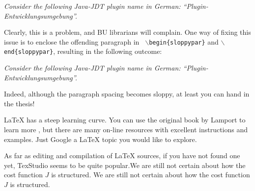 \bigskip

{\it Consider the following Java-JDT plugin name in German: "`Plugin-Entwicklungsumgebung"'.}

\bigskip

Clearly, this is a problem, and BU librarians will complain. One way of fixing
this issue is to enclose the offending paragraph in {\tt
	$\backslash$begin\{sloppypar\}} and {\tt $\backslash$end\{sloppypar\}},
resulting in the following outcome:

\bigskip

\begin{sloppypar}
	{\it Consider the following Java-JDT plugin name in German:
		"`Plugin-Entwicklungsumgebung"'.}
\end{sloppypar}

\bigskip

Indeed, although the paragraph spacing becomes sloppy, at least you can hand in
the thesis!


LaTeX has a steep learning curve. You can use the original book by Lamport to
learn more \cite{lamport1985:latex}, but there are many on-line resources with
excellent instructions and examples. Just Google a LaTeX topic you would like to
explore.

As far as editing and compilation of LaTeX sources, if you have not found one
yet, TexStudio seems to be quite popular.We are still not certain about how the cost function $J$ is structured. We are still not certain about how the cost function $J$ is structured.

